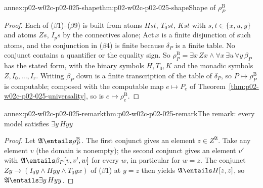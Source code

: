 \begin{annexitem}{annex:p02-w02c-p02-025-shape}{thm:p02-w02c-p02-025-shape}{Shape of \(\rho^{\mathrm B}_P\)}
\begin{proof}
Each of (\(\beta\)1)--(\(\beta\)9) is built from atoms \(Hst\), \(T_0st\),
\(Kst\) with \(s,t\in\{x,u,y\}\) and atoms \(Zs\), \(I_ps\) by the connectives
alone; \(\mathrm{Act}\,x\) is a finite disjunction of such atoms, and the
conjunction in (\(\beta\)4) is finite because \(\delta_P\) is a finite table.  No
conjunct contains a quantifier or the equality sign.  So
\(\rho^{\mathrm B}_P=\exists x\,Zx\land\forall x\,\exists u\,\forall y\,\beta_P\)
has the stated form, with the binary symbols \(H,T_0,K\) and the monadic
symbols \(Z,I_0,\ldots,I_r\).  Writing \(\beta_P\) down is a finite
transcription of the table of \(\delta_P\), so \(P\mapsto\rho^{\mathrm B}_P\) is
computable; composed with the computable map \(e\mapsto P_e\) of
Theorem~\ref{thm:p02-w02c-p02-025-universality}, so is
\(e\mapsto\rho^{\mathrm B}_e\).
\end{proof}
\end{annexitem}

\begin{annexitem}{annex:p02-w02c-p02-025-remark}{thm:p02-w02c-p02-025-remark}{The remark: every model satisfies \(\exists y\,Hyy\)}
\begin{proof}
Let \(\mathfrak A\entails\rho^{\mathrm B}_P\).  The first conjunct gives an
element \(z\in Z^{\mathfrak A}\).  Take any element \(v\) (the domain is
nonempty); the second conjunct gives an element \(v'\) with
\(\mathfrak A\entails\beta_P[v,v',w]\) for every \(w\), in particular for
\(w=z\).  The conjunct \(Zy\to(I_0y\land Hyy\land T_0yx)\) of (\(\beta\)1) at
\(y=z\) then yields \(\mathfrak A\entails H[z,z]\), so
\(\mathfrak A\entails\exists y\,Hyy\).
\end{proof}
\end{annexitem}

